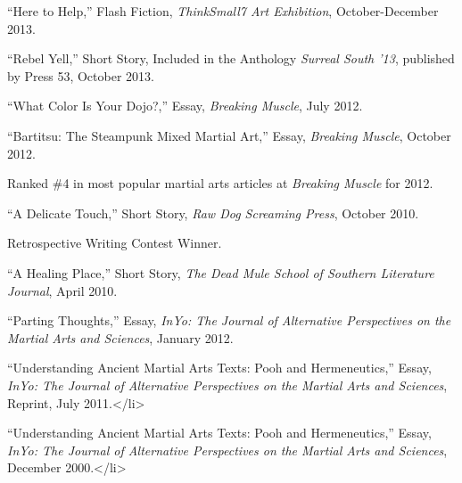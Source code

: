 \documentclass[11pt,article,oneside]{memoir}
\begin{document}
\ind “Here to Help,” Flash Fiction, \emph{ThinkSmall7 Art Exhibition}, October-December 2013.

\ind “Rebel Yell,” Short Story, Included in the Anthology \emph{Surreal South ’13}, published by Press 53, October 2013.

\ind “What Color Is Your Dojo?,” Essay, \emph{Breaking Muscle}, July 2012.

\ind “Bartitsu: The Steampunk Mixed Martial Art,” Essay, \emph{Breaking Muscle}, October 2012. 

\ind \hspace{0.35in} \footnotesize Ranked \#4 in most popular martial arts articles at \emph{Breaking Muscle} for 2012.\normalsize \vspace{0.05in}


\ind “A Delicate Touch,” Short Story, \emph{Raw Dog Screaming Press}, October 2010. 

\ind \hspace{0.35in} \footnotesize Retrospective Writing Contest Winner.\normalsize \vspace{0.05in}

\ind “A Healing Place,” Short Story, \emph{The Dead Mule  School of Southern Literature Journal}, April 2010.
	
\ind “Parting Thoughts,” Essay, \emph{InYo: The Journal of Alternative Perspectives on the Martial Arts and Sciences}, January 2012.

\ind “Understanding Ancient Martial Arts Texts: Pooh and Hermeneutics,” Essay, \emph{InYo: The Journal of Alternative Perspectives on the Martial Arts and Sciences}, Reprint, July 2011.</li>
		
\ind “Understanding Ancient Martial Arts Texts: Pooh and Hermeneutics,” Essay, \emph{InYo: The Journal of Alternative Perspectives on the Martial Arts and Sciences}, December 2000.</li>
		



\end{document}
